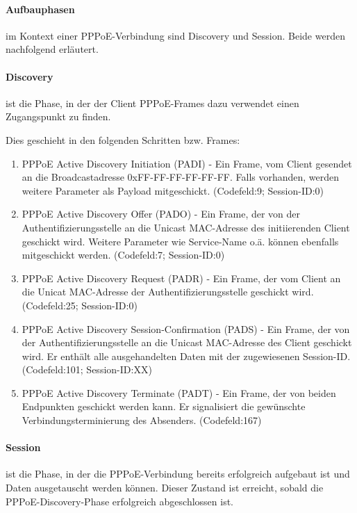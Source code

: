 \paragraph{Aufbauphasen}
im Kontext einer PPPoE-Verbindung sind Discovery und Session.
Beide werden nachfolgend erläutert.

\paragraph{Discovery}
ist die Phase, in der der Client PPPoE-Frames dazu verwendet einen
Zugangspunkt zu finden.

Dies geschieht in den folgenden Schritten bzw. Frames:
\begin{enumerate}
\item PPPoE Active Discovery Initiation (PADI) - Ein Frame, vom Client
      gesendet an die Broadcastadresse 0xFF-FF-FF-FF-FF-FF.
      Falls vorhanden, werden weitere Parameter als Payload 
      mitgeschickt. (Codefeld:9; Session-ID:0)
\item PPPoE Active Discovery Offer (PADO) - Ein Frame, der von der
      Authentifizierungsstelle an die Unicast MAC-Adresse des
      initiierenden Client geschickt wird. Weitere Parameter wie
      Service-Name o.ä. können ebenfalls mitgeschickt
      werden. (Codefeld:7; Session-ID:0)
\item PPPoE Active Discovery Request (PADR) - Ein Frame, der vom Client
      an die Unicat MAC-Adresse der Authentifizierungsstelle geschickt
      wird. (Codefeld:25; Session-ID:0)
\item PPPoE Active Discovery Session-Confirmation (PADS) - Ein Frame,
      der von der Authentifizierungsstelle an die Unicast MAC-Adresse
      des Client geschickt wird. Er enthält alle ausgehandelten Daten
      mit der zugewiesenen Session-ID. (Codefeld:101; Session-ID:XX)
\item PPPoE Active Discovery Terminate (PADT) - Ein Frame,
      der von beiden Endpunkten geschickt werden kann. Er signalisiert
      die gewünschte Verbindungsterminierung des Absenders.
      (Codefeld:167)
\end{enumerate}

\paragraph{Session}
ist die Phase, in der die PPPoE-Verbindung bereits erfolgreich
aufgebaut ist und Daten ausgetauscht werden können.
Dieser Zustand ist erreicht, sobald die PPPoE-Discovery-Phase
erfolgreich abgeschlossen ist.


